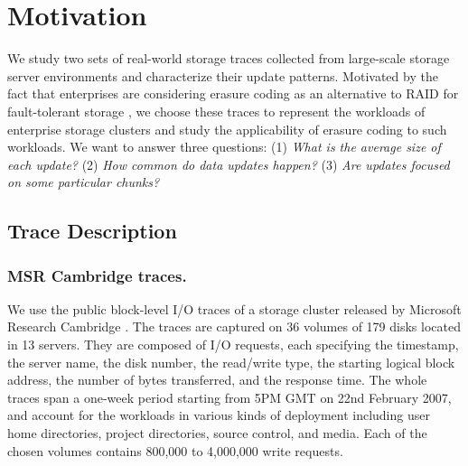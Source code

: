 
\chapter{Motivation} 
\label{chap:motivation}
\label{sec:trace}

We study two sets of real-world storage traces collected from large-scale
storage server environments and characterize their update patterns.  Motivated
by the fact that enterprises are considering erasure coding as an alternative
to RAID for fault-tolerant storage \cite{raid_alternatives}, we choose these
traces to represent the workloads of enterprise storage clusters and study the
applicability of erasure coding to such workloads.  We want to answer three
questions: (1) \textit{What is the average size of each update?} (2)
\textit{How common do data updates happen?} (3) \textit{Are updates focused on
some particular chunks?}  


\section{Trace Description}

\subsection{MSR Cambridge traces.} We use the public block-level
I/O traces of a storage cluster released by Microsoft Research Cambridge
\cite{narayanan08}. The traces are captured %
on 36 volumes of 179 disks located in 13 servers.  They are composed
of I/O requests, each specifying the timestamp, the server name, the disk
number, the read/write type, the starting logical block address, 
the number of bytes transferred, and the response time.  The whole
traces span a one-week period starting from 5PM GMT on 22nd February 2007, and
account for the workloads in various kinds of deployment including user home
directories, project directories, source control, and media.  
Each of the chosen volumes contains 800,000 to 4,000,000 write requests. 

